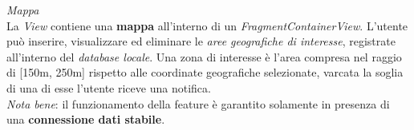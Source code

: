 \documentclass{article}
\begin{document}
\textit{Mappa} \vspace*{7pt}\\
La \textit{View} contiene una \textbf{mappa} all'interno di un \textit{FragmentContainerView}. L'utente può inserire, visualizzare ed eliminare le \textit{aree geografiche di interesse}, registrate all'interno del \textit{database locale}. Una zona di interesse è l'area compresa nel raggio di [150m, 250m] rispetto alle coordinate geografiche selezionate, varcata la soglia di una di esse l'utente riceve una notifica. \vspace*{7pt}\\
\textit{Nota bene}: il funzionamento della feature è garantito solamente in presenza di una \textbf{connessione dati stabile}.
\begin{center}
    \begin{figure}[H]
        \centering
    \end{figure}
\end{center}
\end{document}
